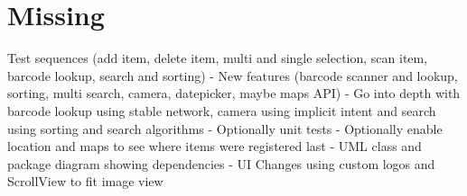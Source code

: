 \documentclass{article}
\begin{document}
\section{Missing}
Test sequences (add item, delete item, multi and single selection, scan item, barcode lookup, search and sorting)
- New features (barcode scanner and lookup, sorting, multi search, camera, datepicker, maybe maps API)
- Go into depth with barcode lookup using stable network, camera using implicit intent and search using sorting and search algorithms 
- Optionally unit tests 
- Optionally enable location and maps to see where items were registered last 
- UML class and package diagram showing dependencies 
- UI Changes using custom logos and ScrollView to fit image view 

	
\end{document}
